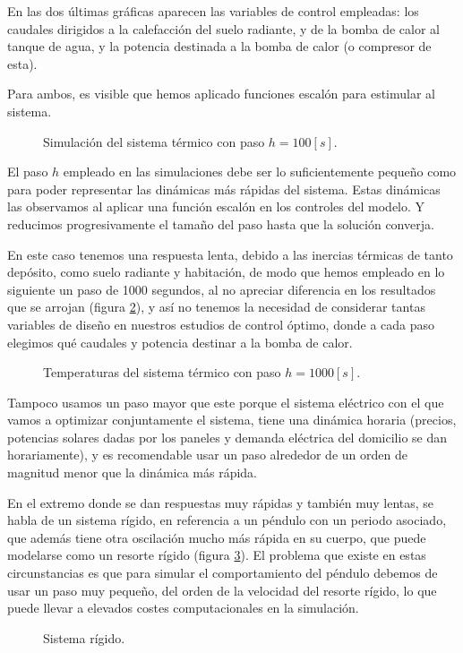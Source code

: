 En las dos últimas gráficas aparecen las variables de control empleadas: los
caudales dirigidos a la calefacción del suelo radiante, y de la bomba de calor
al tanque de agua, y la potencia destinada a la bomba de calor (o compresor de
esta).

Para ambos, es visible que hemos aplicado funciones escalón para estimular al
sistema.

\begin{figure}[h] \centering
	\centering
	
	\caption{Simulación del sistema térmico con paso $h=100[s]$.}
	\label{fig:simulacion_1_h:100s}
\end{figure}


El paso $h$ empleado en las simulaciones debe ser lo suficientemente pequeño
como para poder representar las dinámicas más rápidas del sistema. Estas
dinámicas las observamos al aplicar una función escalón en los controles del
modelo. Y reducimos progresivamente el tamaño del paso hasta que la solución
converja.

En este caso tenemos una respuesta lenta, debido a las inercias térmicas de
tanto depósito, como suelo radiante y habitación, de modo que hemos empleado en
lo siguiente un paso de 1000 segundos, al no apreciar diferencia en los
resultados que se arrojan (figura \ref{fig:simulacion_2_h:1000s}), y así no
tenemos la necesidad de considerar tantas variables de diseño en nuestros
estudios de control óptimo, donde a cada paso elegimos qué caudales y potencia
destinar a la bomba de calor.

\begin{figure}[h] \centering
	\centering
	
	\caption{Temperaturas del sistema térmico con paso $h=1000[s]$.}
	\label{fig:simulacion_2_h:1000s}
\end{figure}

Tampoco usamos un paso mayor que este porque el sistema eléctrico con el que
vamos a optimizar conjuntamente el sistema, tiene una dinámica horaria
(precios, potencias solares dadas por los paneles y demanda eléctrica del
domicilio se dan horariamente), y es recomendable usar un paso alrededor de un orden
de magnitud menor que la dinámica más rápida.

En el extremo donde se dan respuestas muy rápidas y también muy lentas, se
habla de un sistema rígido, en referencia a un péndulo con un periodo asociado,
que además tiene otra oscilación mucho más rápida en su cuerpo, que puede
modelarse como un resorte rígido (figura \ref{fig:stiff_system}). El problema
que existe en estas circunstancias es que para simular el comportamiento del
péndulo debemos de usar un paso muy pequeño, del orden de la velocidad del
resorte rígido, lo que puede llevar a elevados costes computacionales en la
simulación.

\begin{figure}[h] \centering
	\centering
	
	\caption{Sistema rígido.}
	\label{fig:stiff_system}
\end{figure}
